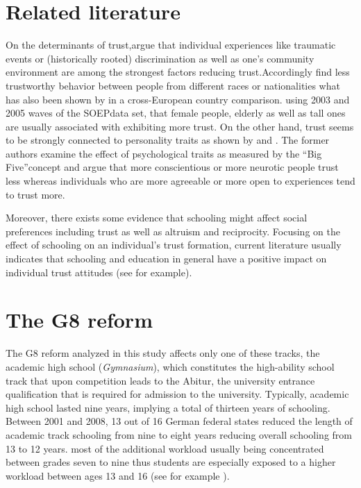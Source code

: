 \documentclass[11pt, a4paper, leqno]{article}
\begin{document}
\section{Related literature\label{sec:literature}}
On the determinants of trust,\citep{alesina2002trusts}argue that individual experiences like 
traumatic events or (historically rooted) discrimination as well as one's community environment are 
among the strongest factors reducing trust.Accordingly \citep{glaeser1999social}find less trustworthy
behavior between people from different races or nationalities what has also been shown by 
\citep{Borgonovi2012} in a cross-European country comparison. \citep{dohmen2008representative} 
using 2003 and 2005 waves of the SOEPdata set, that female people, elderly as well as tall ones 
are usually associated with exhibiting more trust. On the other hand, trust seems to be strongly 
connected to personality traits as shown by \citep{dohmen2008representative} and 
\citep{becker2012relationship}. The former authors examine the effect of psychological traits as 
measured by the ``Big Five''concept and argue that more conscientious or more neurotic people 
trust less whereas individuals who are more agreeable or more open to experiences tend to trust more.
\par Moreover, there exists some evidence that schooling might affect social preferences 
including trust as well as altruism and reciprocity. Focusing on the effect of schooling on an 
individual's trust formation, current literature usually indicates that schooling and education 
in general have a positive impact on individual trust attitudes (see for example\citep{oreopoulos2011priceless}).

\section{The G8 reform\label{sec:reform}}
The G8 reform analyzed in this study affects only one of these tracks, the academic high school (\textit{Gymnasium}), 
which constitutes the high-ability school track that upon competition leads to the Abitur, the university entrance 
qualification that is required for admission to the university. Typically, academic high school lasted nine years, 
implying a total of thirteen years of schooling. Between 2001 and 2008, 13 out of 16 German federal states reduced 
the length of academic track schooling from nine to eight years reducing overall schooling from 13 to 12 years.
most of the additional workload usually being concentrated between grades seven to nine thus students are especially 
exposed to a higher workload between ages 13 and 16 (see for example \citep{dahmann2014impact, dahmann2018cross}).
\end{document}
